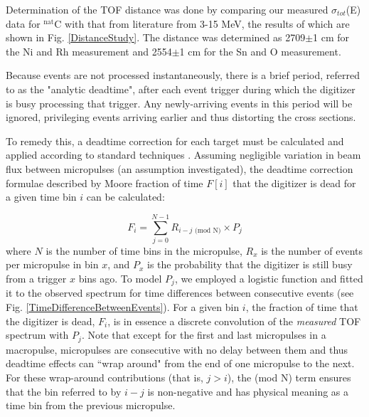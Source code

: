 \documentclass[twocolumn,secnumarabic,amssymb, nobibnotes, aps, prl,
superscriptaddress, nobalancelastpage]{revtex4}
\newcommand{\totEs}{\ensuremath{\sigma_{tot}}(E)\,\,}
\begin{document}
Determination of the TOF distance was done by comparing our measured \totEs data
for $^{\text{nat}}$C with that from literature from 3-15 MeV, the results of which are
shown in Fig. \ref{DistanceStudy}. The distance was determined as 2709$\pm$1 cm
for the Ni and Rh measurement and 2554$\pm$1 cm for the Sn and O measurement.

Because events are not processed instantaneously, there is a brief period,
referred to as the "analytic deadtime", after each event trigger during which
the digitizer is busy processing that trigger. Any newly-arriving events in this
period will be ignored, privileging events arriving earlier and thus distorting
the cross sections.

To remedy this, a deadtime correction for
each target must be calculated and applied according to standard techniques
\cite{Moore1980}. Assuming negligible variation in beam flux between micropulses
(an assumption investigated), the deadtime correction formulae described by
Moore
fraction of time $F[i]$ that the digitizer is dead for a given time bin $i$ can
be calculated:

\begin{equation}
    F_{i} = \sum^{N-1}_{j=0} R_{i-j\text{ (mod N)}}\times P_{j}
\end{equation}
where $N$ is the number of time bins in the micropulse, $R_{x}$ is the number of
events per micropulse in bin $x$, and $P_{x}$ is the probability that the
digitizer is still busy from a trigger $x$ bins ago. To model $P_{j}$, we
employed a logistic function and fitted it to the observed spectrum for time
differences between consecutive events (see Fig.
\ref{TimeDifferenceBetweenEvents}). For a given bin $i$, the fraction of time that the 
digitizer is dead, $F_{i}$, is in essence a discrete convolution of the
\textit{measured} TOF spectrum with $P_{j}$. Note that except for the first and
last micropulses in a macropulse, micropulses are
consecutive with no delay between them and thus deadtime effects can
``wrap around" from the end of one micropulse to the next. For these wrap-around
contributions (that is, $j>i$), the (mod N) term ensures that the bin referred
to by $i-j$ is non-negative and has physical meaning as a time bin from the previous 
micropulse.
\end{document}
